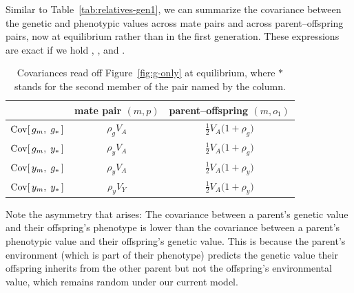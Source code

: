 \documentclass[12pt]{article}
\begin{document}
Similar to Table~\ref{tab:relatives-gen1}, we can summarize the covariance between the genetic and phenotypic values across mate pairs and across parent--offspring pairs, now at equilibrium rather than in the first generation.
These expressions are exact if we hold , , and .

\begin{table}[H]
    \begin{floatcard}
    \renewcommand{\arraystretch}{1.9}
    \setlength{\tabcolsep}{6pt}
    \footnotesize
    \begin{tabular}{l|cc}
            & mate pair $(m,p)$
            & parent--offspring $(m,o_1)$ \\
        \hline
        $\mathrm{Cov}[\,g_m,\; g_\ast\,]$
            & $\rho_g V_A$
            & $\tfrac12 V_A\big(1+\rho_g\big)$ \\
        $\mathrm{Cov}[\,g_m,\; y_\ast\,]$
            & $\rho_y V_A$
            & $\tfrac12 V_A\big(1+\rho_g\big)$ \\
        $\mathrm{Cov}[\,y_m,\; g_\ast\,]$
            & $\rho_y V_A$
            & $\tfrac12 V_A\big(1+\rho_y\big)$ \\
        $\mathrm{Cov}[\,y_m,\; y_\ast\,]$
            & $\rho_y V_Y$
            & $\tfrac12 V_A\big(1+\rho_y\big)$ \\
    \end{tabular}
    \caption{%
        Covariances read off Figure~\ref{fig:g-only} at equilibrium, where $\ast$ stands for the second member of the pair named by the column.%
    }
    \label{tab:g-only-cov}
    \end{floatcard}
\end{table}

Note the asymmetry that arises:
The covariance between a parent's genetic value and their offspring's phenotype is lower than the covariance between a parent's phenotypic value and their offspring's genetic value.
This is because the parent's environment (which is part of their phenotype) predicts the genetic value their offspring inherits from the other parent but not the offspring's environmental value, which remains random under our current model.

\iffalse
\end{document}
